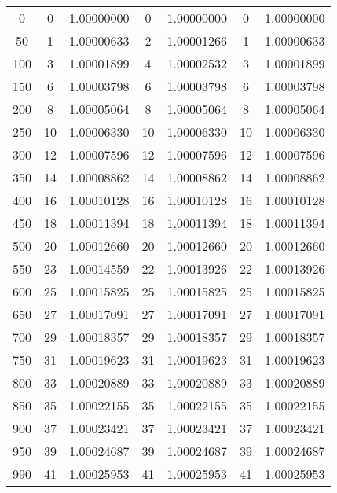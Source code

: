 \begin{table}
\begin{tabular}{S[table-format = 3.0] | S[table-format = 2.0] S | S[table-format = 2.0] S | S[table-format = 2.0] S}
            &  0   &   1.00000000  &  0   & 1.00000000  & 0   &  1.00000000  \\
        50   &  1   &   1.00000633  &  2   & 1.00001266  & 1   &  1.00000633  \\
        100  &  3   &   1.00001899  &  4   & 1.00002532  & 3   &  1.00001899  \\
        150  &  6   &   1.00003798  &  6   & 1.00003798  & 6   &  1.00003798  \\
        200  &  8   &   1.00005064  &  8   & 1.00005064  & 8   &  1.00005064  \\
        250  &  10  &   1.00006330  &  10  & 1.00006330  & 10  &  1.00006330  \\
        300  &  12  &   1.00007596  &  12  & 1.00007596  & 12  &  1.00007596  \\
        350  &  14  &   1.00008862  &  14  & 1.00008862  & 14  &  1.00008862  \\
        400  &  16  &   1.00010128  &  16  & 1.00010128  & 16  &  1.00010128  \\
        450  &  18  &   1.00011394  &  18  & 1.00011394  & 18  &  1.00011394  \\
        500  &  20  &   1.00012660  &  20  & 1.00012660  & 20  &  1.00012660  \\
        550  &  23  &   1.00014559  &  22  & 1.00013926  & 22  &  1.00013926  \\
        600  &  25  &   1.00015825  &  25  & 1.00015825  & 25  &  1.00015825  \\
        650  &  27  &   1.00017091  &  27  & 1.00017091  & 27  &  1.00017091  \\
        700  &  29  &   1.00018357  &  29  & 1.00018357  & 29  &  1.00018357  \\
        750  &  31  &   1.00019623  &  31  & 1.00019623  & 31  &  1.00019623  \\
        800  &  33  &   1.00020889  &  33  & 1.00020889  & 33  &  1.00020889  \\
        850  &  35  &   1.00022155  &  35  & 1.00022155  & 35  &  1.00022155  \\
        900  &  37  &   1.00023421  &  37  & 1.00023421  & 37  &  1.00023421  \\
        950  &  39  &   1.00024687  &  39  & 1.00024687  & 39  &  1.00024687  \\
        990  &  41  &   1.00025953  &  41  & 1.00025953  & 41  &  1.00025953  \\

        \bottomrule

    \end{tabular}
\end{table}


